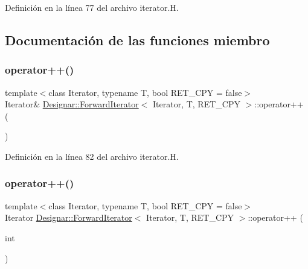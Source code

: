 Definición en la línea 77 del archivo iterator.\+H.



\subsection{Documentación de las funciones miembro}
\mbox{\label{class_designar_1_1_forward_iterator_a021a9305def76c968872089a778d2b41}} 
\subsubsection{\texorpdfstring{operator++()}{operator++()}\hspace{0.1cm}{\footnotesize\ttfamily [1/2]}}
{\footnotesize\ttfamily template$<$class Iterator, typename T, bool R\+E\+T\+\_\+\+C\+PY = false$>$ \\
Iterator\& \hyperlink{class_designar_1_1_forward_iterator}{Designar\+::\+Forward\+Iterator}$<$ Iterator, T, R\+E\+T\+\_\+\+C\+PY $>$\+::operator++ (\begin{DoxyParamCaption}{ }\end{DoxyParamCaption})\hspace{0.3cm}{\ttfamily [inline]}}



Definición en la línea 82 del archivo iterator.\+H.

\mbox{\label{class_designar_1_1_forward_iterator_a7182625f3375ba05868ae6f240628b1c}} 
\subsubsection{\texorpdfstring{operator++()}{operator++()}\hspace{0.1cm}{\footnotesize\ttfamily [2/2]}}
{\footnotesize\ttfamily template$<$class Iterator, typename T, bool R\+E\+T\+\_\+\+C\+PY = false$>$ \\
Iterator \hyperlink{class_designar_1_1_forward_iterator}{Designar\+::\+Forward\+Iterator}$<$ Iterator, T, R\+E\+T\+\_\+\+C\+PY $>$\+::operator++ (\begin{DoxyParamCaption}\item[{int}]{ }\end{DoxyParamCaption})\hspace{0.3cm}{\ttfamily [inline]}}



